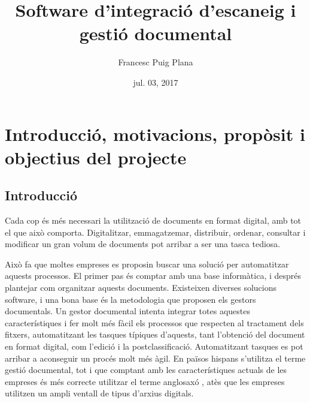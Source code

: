 \documentclass[letterpaper,11pt,catalan]{sphinxmanual}
\title{Software d'integració d'escaneig i gestió documental}
\date{jul. 03, 2017}
\author{Francesc Puig Plana}
\begin{document}
\maketitle
\sphinxtableofcontents
{}\label{\detokenize{index::doc}}



\chapter{Introducció, motivacions, propòsit i objectius del projecte}
\label{\detokenize{index:software-dintegracio-global-descaneig-i-gestio-documental}}\label{\detokenize{index:introduccio-motivacions-proposit-i-objectius-del-projecte}}

\section{Introducció}
\label{\detokenize{index:introduccio}}
Cada cop és més necessari la utilització de documents en format digital, amb tot
el que això comporta. Digitalitzar, emmagatzemar, distribuir, ordenar, consultar i modificar un gran volum
de documents pot arribar a ser una tasca tediosa.

Això fa que moltes empreses es proposin buscar una solució per automatitzar aquests processos.
El primer pas és comptar amb una base informàtica, i després plantejar com organitzar aquests documents.
Existeixen diverses solucions software, i una bona base és la metodologia que
proposen els gestors documentals. Un gestor documental intenta integrar totes aquestes
característiques i fer molt més fàcil els processos que respecten al tractament dels fitxers,
automatitzant les tasques típiques d'aquests, tant l'obtenció del document en format digital,
com l'edició i la postclassificació.
Automatitzant tasques es pot arribar a aconseguir un procés molt més àgil. En països hispans s'utilitza el terme
gestió documental, tot i que comptant amb les característiques actuals de les empreses és més correcte
utilitzar el terme anglosaxó , atès que les empreses utilitzen un
ampli ventall de tipus d'arxius digitals.
\end{document}
